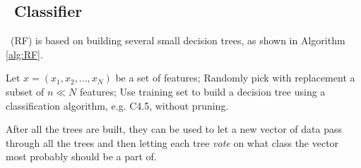 \subsection{\rf\ Classifier}
\rf\ (RF) is based on building several small decision trees, as shown in Algorithm \ref{alg:RF}.

\begin{algorithm}
\small
\caption{\rf\
    \label{alg:RF}}
\begin{algorithmic}
\State Let $x = (x_1,x_2,...,x_N)$ be a set of features;
	\State Randomly pick with replacement a subset of $n \ll N$ features;
	\State Use training set to build a decision tree using a classification algorithm, e.g. C4.5, without pruning.
\EndWhile
\end{algorithmic}
\end{algorithm}
After all the trees are built, they can be used to let a new vector of data pass through all the trees and then letting each tree \emph{vote} on what class the vector most probably should be a part of. \cite{RFWeb}